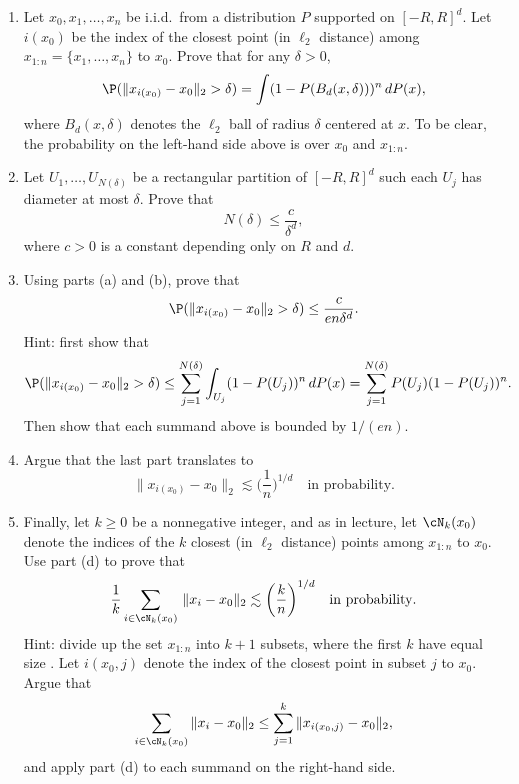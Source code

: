 \documentclass{article}
\begin{document}
\begin{enumerate}[label=(\alph*)]
\item Let $x_0,x_1,\dots,x_n$ be i.i.d.\ from a distribution $P$ supported on
  $[-R,R]^d$. Let $i(x_0)$ be the index of the closest point (in $\ell_2$
  distance) among $x_{1:n} = \{x_1,\dots,x_n\}$ to $x_0$. Prove that for any
  $\delta > 0$,
  \marginpar{\small [3 pts]}
  \[
  \P( \|x_{i(x_0)} - x_0 \|_2 > \delta ) = \int (1 - P(B_d(x, \delta)))^n \,
  dP(x),
  \]
  where $B_d(x, \delta)$ denotes the $\ell_2$ ball of radius $\delta$
  centered at $x$. To be clear, the probability on the left-hand side above is
  over $x_0$ and $x_{1:n}$.

\item Let $U_1,\dots,U_{N(\delta)}$ be a rectangular partition of $[-R,R]^d$
  such each $U_j$ has diameter at most $\delta$. Prove that 
  \marginpar{\small [2 pts]}
  \[
  N(\delta) \leq \frac{c}{\delta^d},
  \]
  where $c>0$ is a constant depending only on $R$ and $d$. 

\item Using parts (a) and (b), prove that 
  \marginpar{\small [7 pts]}
  \[
  \P( \|x_{i(x_0)} - x_0 \|_2 > \delta ) \leq \frac{c}{e n \delta^d}.
  \]
  Hint: first show that
  \[
  \P( \|x_{i(x_0)} - x_0 \|_2 > \delta ) \leq \sum_{j=1}^{N(\delta)}
  \int_{U_j} (1 - P(U_j))^n \, dP(x) = \sum_{j=1}^{N(\delta)} P(U_j) (1 -
  P(U_j))^n. 
  \]
  Then show that each summand above is bounded by $1/(en)$.

\item Argue that the last part translates to
  \marginpar{\small [1 pts]}
  \[
  \|x_{i(x_0)} - x_0 \|_2 \lesssim \bigg( \frac{1}{n} \bigg)^{1/d} \quad 
  \text{in probability}.
  \]

\item Finally, let $k \geq 0$ be a nonnegative integer, and as in lecture, let  
  $\cN_k(x_0)$ denote the indices of the $k$ closest (in $\ell_2$ distance)
  points among $x_{1:n}$ to $x_0$. Use part (d) to prove that 
  \marginpar{\small [4 pts]}
  \[
  \frac{1}{k} \sum_{i \in \cN_k(x_0)} \, \|x_i - x_0\|_2 \lesssim \bigg(
  \frac{k}{n} \bigg)^{1/d} \quad \text{in probability}. 
  \]
  Hint: divide up the set $x_{1:n}$ into $k+1$ subsets, where the first $k$ have
  equal size . Let $i(x_0, j)$ denote the index of
  the closest point in subset $j$ to $x_0$. Argue that 
  \[
  \sum_{i \in \cN_k(x_0)} \|x_i - x_0\|_2 \leq \sum_{j=1}^k \|x_{i(x_0,j)} -
  x_0\|_2, 
  \]
  and apply part (d) to each summand on the right-hand side. 
 
\end{enumerate}
\end{document}
